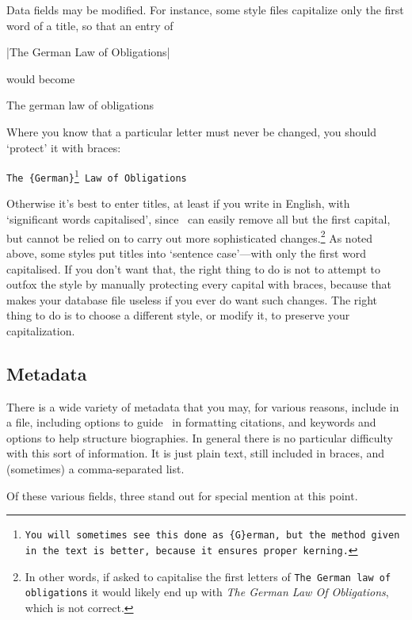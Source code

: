 Data fields may be modified. For instance, some style files capitalize
only the first word of a title, so that an entry of
\begin{center}
|The German Law of Obligations|
\end{center}
would become
\begin{center}
The german law of obligations
\end{center}
Where you know that a particular letter must never be changed, you should `protect' it with braces:
\begin{center}
\texttt{The \{German\}\footnote{You will sometimes see this done as \texttt{\{G\}erman}, but the method given in the text is better, because it ensures proper kerning.} Law of Obligations}
\end{center}
Otherwise it's best to enter titles, at least if you write in English,
with `significant words capitalised', since \biblatex\ can easily
remove all but the first capital, but cannot be relied on to carry out
more sophisticated changes.\footnote{In other words, if asked to
  capitalise the first letters of \texttt{The German law of
    obligations} it would likely end up with \emph{The German Law Of
    Obligations}, which is not correct.} As noted above, some styles
put titles into `sentence case'---with only the first word
capitalised. If you don't want that, the right thing to do is not to
attempt to outfox the style by manually protecting every capital with
braces, because that makes your database file useless if you ever do
want such changes. The right thing to do is to choose a different
style, or modify it, to preserve your capitalization.

\subsection{Metadata}

There is a wide variety of metadata that you may, for various reasons,
include in a file, including options to guide \biblatex\ in formatting
citations, and keywords and options to help structure biographies. In
general there is no particular difficulty with this sort of
information. It is just plain text, still included in braces, and
(sometimes) a comma-separated list.

Of these various fields, three stand out for special mention at this
point.

